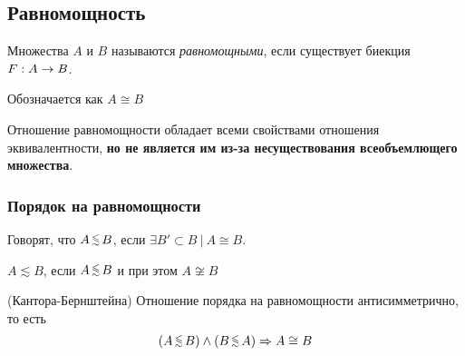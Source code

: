 \subsection{Равномощность}

\begin{definition}
	Множества $A$ и $B$ называются \textit{равномощными}, если существует биекция $F : A \rightarrow B$.
	
	Обозначается как $A \cong B$
\end{definition}

\begin{note}
	Отношение равномощности обладает всеми свойствами отношения эквивалентности, \textbf{но не является им из-за несуществования всеобъемлющего множества}.
\end{note}

\subsubsection*{Порядок на равномощности}

\begin{definition}
	Говорят, что $A \leqsim B$, если $\exists B' \subset B\ |\ A \cong B$.
\end{definition}

\begin{definition}
	$A \lesssim B$, если $A \leqsim B$ и при этом $A \not\cong B$
\end{definition}

\begin{theorem} (Кантора-Бернштейна)
	Отношение порядка на равномощности антисимметрично, то есть
	$$
		(A \leqsim B) \wedge (B \leqsim A) \Ra A \cong B
	$$
\end{theorem}
